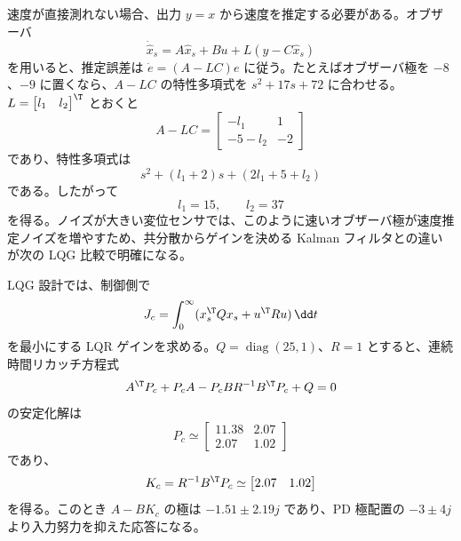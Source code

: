 速度が直接測れない場合、出力 $y=x$ から速度を推定する必要がある。オブザーバ
\begin{equation}
  \dot{\hat{x}}_s=A\hat{x}_s+Bu+L(y-C\hat{x}_s)
\end{equation}
を用いると、推定誤差は $\dot{e}=(A-LC)e$ に従う。たとえばオブザーバ極を $-8$、$-9$ に置くなら、$A-LC$ の特性多項式を $s^2+17s+72$ に合わせる。$L=\begin{bmatrix}l_1&l_2\end{bmatrix}^\T$ とおくと
\begin{equation}
  A-LC=
  \begin{bmatrix}
    -l_1&1\\
    -5-l_2&-2
  \end{bmatrix}
\end{equation}
であり、特性多項式は
\begin{equation}
  s^2+(l_1+2)s+(2l_1+5+l_2)
\end{equation}
である。したがって
\begin{equation}
  l_1=15,\qquad l_2=37
\end{equation}
を得る。ノイズが大きい変位センサでは、このように速いオブザーバ極が速度推定ノイズを増やすため、共分散からゲインを決める Kalman フィルタとの違いが次の LQG 比較で明確になる。

LQG 設計では、制御側で
\begin{equation}
  J_c=\int_0^\infty (x_s^\T Q x_s+u^\T R u)\,\dd t
\end{equation}
を最小にする LQR ゲインを求める。$Q=\operatorname{diag}(25,1)$、$R=1$ とすると、連続時間リカッチ方程式
\begin{equation}
  A^\T P_c+P_cA-P_cBR^{-1}B^\T P_c+Q=0
\end{equation}
の安定化解は
\begin{equation}
  P_c\simeq
  \begin{bmatrix}
    11.38&2.07\\
    2.07&1.02
  \end{bmatrix}
\end{equation}
であり、
\begin{equation}
  K_c=R^{-1}B^\T P_c
  \simeq
  \begin{bmatrix}
    2.07&1.02
  \end{bmatrix}
\end{equation}
を得る。このとき $A-BK_c$ の極は $-1.51\pm2.19j$ であり、PD 極配置の $-3\pm4j$ より入力努力を抑えた応答になる。

